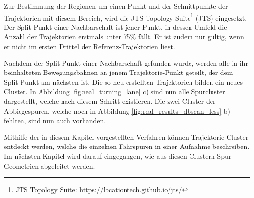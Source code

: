 Zur Bestimmung der Regionen um einen Punkt und der Schnittpunkte der Trajektorien mit diesem Bereich,
wird die JTS Topology Suite\footnote{JTS Topology Suite: \url{https://locationtech.github.io/jts/}}
(JTS) eingesetzt. Der Split-Punkt einer Nachbarschaft ist jener Punkt, in dessen Umfeld die Anzahl der
Trajektorien erstmals unter 75\% fällt. Er ist zudem nur gültig, wenn er nicht im ersten Drittel der
Referenz-Trajektorien liegt.

Nachdem der Split-Punkt einer Nachbarschaft gefunden wurde, werden alle in ihr beinhalteten Bewegungsbahnen
an jenem Trajektorie-Punkt geteilt, der dem Split-Punkt am nächsten ist. 
Die so neu erstellten Trajektorien bilden ein neues Cluster. In Abbildung \ref{fig:real_turning_lane} c)
sind nun alle Spurcluster dargestellt, welche nach diesem Schritt existieren. Die zwei Cluster der Abbiegespuren,
welche noch in Abbildung \ref{fig:real_results_dbscan_lcss} b) fehlten, sind nun auch vorhanden.

Mithilfe der in diesem Kapitel vorgestellten Verfahren können Trajektorie-Cluster entdeckt werden, welche
die einzelnen Fahrspuren in einer Aufnahme beschreiben. Im nächsten Kapitel wird darauf eingegangen, wie
aus diesen Clustern Spur-Geometrien abgeleitet werden.